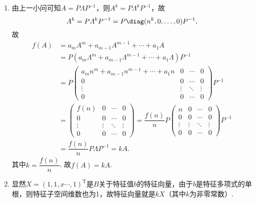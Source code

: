 \begin{exercise}
\begin{exgroup}
\begin{answer}
\begin{enumerate}
                \item 由上一小问可知$A=P\varLambda P^{-1}$，则$A^k=P\varLambda^kP^{-1}$，故
                      \[A^k=P\varLambda^kP^{-1}=P\diag(n^k,0,\ldots,0)P^{-1},\]
                      故
                      \begin{align*}
                          f(A) & =a_mA^m+a_{m-1}A^{m-1}+\cdots+a_1A                                                                                                   \\
                               & =P(a_m\varLambda^m+a_{m-1}\varLambda^{m-1}+\cdots+a_1\varLambda)P^{-1}                                                               \\
                               & =P\begin{pmatrix}
                                       a_mn^m+a_{m-1}n^{m-1}+\cdots+a_1n & 0 & \cdots & 0 \\ 0 & 0 & \cdots & 0 \\ \vdots & \vdots & \ddots & \vdots \\ 0 & 0 & \cdots & 0
                                   \end{pmatrix}P^{-1} \\
                               & =\begin{pmatrix}
                                      f(n) & 0 & \cdots & 0 \\ 0 & 0 & \cdots & 0 \\ \vdots & \vdots & \ddots & \vdots \\ 0 & 0 & \cdots & 0
                                  \end{pmatrix}=\dfrac{f(n)}{n}P\begin{pmatrix}
                                                                    n & 0 & \cdots & 0 \\ 0 & 0 & \cdots & 0 \\ \vdots & \vdots & \ddots & \vdots \\ 0 & 0 & \cdots & 0
                                                                \end{pmatrix}P^{-1}    \\
                               & =\dfrac{f(n)}{n}P\varLambda P^{-1}=kA.
                      \end{align*}
                      其中$k=\dfrac{f(n)}{n}$. 故$f(A)=kA$.

                \item 显然$X=(1,1,x\cdots,1)^\mathrm{T}$是$B$关于特征值$b$的特征向量，由于$b$是特征多项式的单根，则特征子空间维数也为1，故特征向量就是$kX$（其中$k$为非零常数）.


\end{enumerate}
\end{answer}
\end{exgroup}
\end{exercise}

